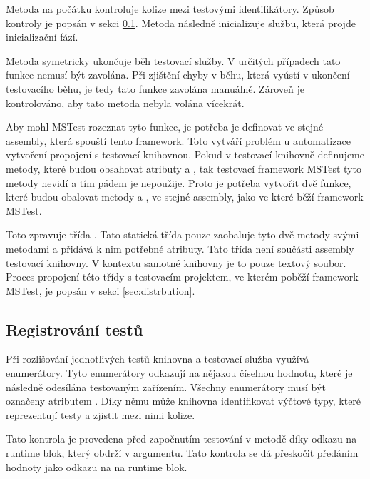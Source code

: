 Metoda  na počátku kontroluje kolize mezi testovými identifikátory. Způsob kontroly je popsán v sekci \ref{sec:reg_test_impl}. Metoda následně inicializuje službu, která projde inicializační fází. 

Metoda  symetricky ukončuje běh testovací služby. V určitých případech tato funkce nemusí být zavolána. Při zjištění chyby v běhu, která vyústí v ukončení testovacího běhu, je tedy tato funkce zavolána manuálně. Zároveň je kontrolováno, aby tato metoda nebyla volána vícekrát.

Aby mohl MSTest rozeznat tyto funkce, je potřeba je definovat ve stejné assembly, která spouští tento framework. Toto vytváří problém u automatizace vytvoření propojení s testovací knihovnou. Pokud v testovací knihovně definujeme metody, které budou obsahovat atributy  a , tak testovací framework  MSTest tyto metody nevidí a tím pádem je nepoužije. Proto je potřeba vytvořit dvě funkce, které budou obalovat metody  a , ve stejné assembly, jako ve které běží framework MSTest.

Toto zpravuje třída . Tato statická třída pouze zaobaluje tyto dvě metody svými metodami a přidává k nim potřebné atributy. Tato třída není součásti assembly testovací knihovny. V kontextu samotné knihovny je to pouze textový soubor. Proces propojení této třídy s testovacím projektem, ve kterém poběží framework MSTest, je popsán v sekci \ref{sec:distrbution}.

\subsection{Registrování testů}\label{sec:reg_test_impl}

Při rozlišování jednotlivých testů knihovna a testovací služba využívá enumerátory. Tyto enumerátory odkazují na nějakou číselnou hodnotu, které je následně odesílána testovaným zařízením. Všechny enumerátory musí být označeny atributem . Díky němu může knihovna identifikovat výčtové typy, které reprezentují testy a zjistit mezi nimi kolize. 

Tato kontrola je provedena před započnutím testování v metodě  díky odkazu na runtime blok, který obdrží v argumentu. Tato kontrola se dá přeskočit předáním hodnoty  jako odkazu na na runtime blok.

